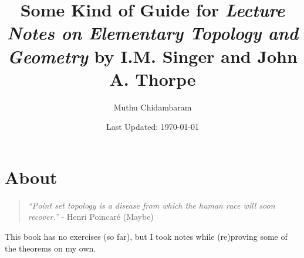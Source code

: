 \documentclass{article}
\begin{document}
\title{Some Kind of Guide for \textit{Lecture Notes on Elementary Topology and Geometry} by I.M. Singer and John A. Thorpe}
\author{Muthu Chidambaram}
\date{Last Updated: \today}

\maketitle

\tableofcontents
\newpage 

\section*{About}

\begin{quote}
        \textit{``Point set topology is a disease from which the human race will soon recover.''} - Henri Poincar\'e (Maybe)
\end{quote}

This book has no exercises (so far), but I took notes while (re)proving some of the theorems on my own.


\end{document}

